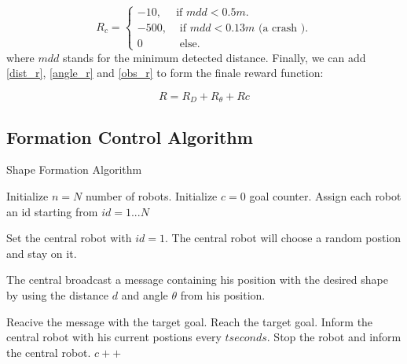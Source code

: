 \documentclass[12pt]{extarticle}
\begin{document}
\begin{equation}  \label{obs_r}
  R_{c}=\begin{cases}
    -10, & \text{if $mdd< 0.5m$}.\\
    -500 , & \text{ if $mdd <0.13m$ (a crash )}.\\
    0 & \text{ else}.
  \end{cases}
\end{equation}
where $mdd$ stands for the minimum detected distance.\linebreak
Finally, we can add \ref{dist_r}, \ref{angle_r} and \ref{obs_r} to form the finale reward function: 

 
    \begin{equation} \label{final_r}
     R=R_{D}+R_{\theta}+R{c}
   \end{equation}






\pagebreak


\subsection{Formation Control Algorithm}


\begin{algorithm}[H]
\caption{Shape Formation Algorithm}
\label{alg:ddpg}
\begin{algorithmic}[1]

\State Initialize $n=N$ number of robots.
\State Initialize $c=0$ goal counter.
\State Assign each robot an id starting from $id=1...N$

\State Set the central robot with $id=1$.
\State The central robot will choose a random postion and stay on it.

\State The central broadcast a message containing his position with the desired shape by using the distance $d$ and angle $\theta$ from his position.

\State Reacive the message with the target goal.
\State Reach the target goal.
\State Inform the central robot with his current postions every $t seconds$.
    \State Stop the robot and inform the central robot.
    \State $c++$ 

\EndIf 

\EndFor

\EndWhile

\end{algorithmic}
\end{algorithm}
\end{document}
